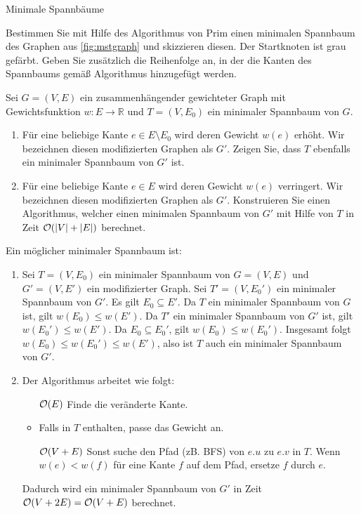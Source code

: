\documentclass{article}
\begin{document}
\begin{eexercises}{Minimale Spannbäume}{}
  \item Bestimmen Sie mit Hilfe des Algorithmus von Prim einen minimalen Spannbaum des Graphen aus \ref{fig:mstgraph} und skizzieren diesen. Der Startknoten ist grau gefärbt. Geben Sie zusätzlich die Reihenfolge an, in der die Kanten des Spannbaums gemäß Algorithmus hinzugefügt werden.
  \item Sei $G = (V, E)$ ein zusammenhängender gewichteter Graph mit Gewichtsfunktion $w : E \rightarrow \mathbb{R}$ und $T = (V, E_0)$ ein minimaler Spannbaum von $G$.
  \begin{enumerate}
    \item Für eine beliebige Kante $e \in E \setminus E_0$ wird deren Gewicht $w(e)$ erhöht. Wir bezeichnen diesen modifizierten Graphen als $G'$. Zeigen Sie, dass $T$ ebenfalls ein minimaler Spannbaum von $G'$ ist.
    \item Für eine beliebige Kante $e \in E$ wird deren Gewicht $w(e)$ verringert. Wir bezeichnen diesen modifizierten Graphen als $G'$. Konstruieren Sie einen Algorithmus, welcher einen minimalen Spannbaum von $G'$ mit Hilfe von $T$ in Zeit $\mathcal{O}(|V| + |E|)$ berechnet.
  \end{enumerate}
\end{eexercises}

\begin{solutions}
  \item Ein möglicher minimaler Spannbaum ist: 
  \item \begin{enumerate}
    \item Sei $T = (V, E_0)$ ein minimaler Spannbaum von $G = (V, E)$ und $G' = (V, E')$ ein modifizierter Graph. Sei $T' = (V, E_0')$ ein minimaler Spannbaum von $G'$. Es gilt $E_0 \subseteq E'$. Da $T$ ein minimaler Spannbaum von $G$ ist, gilt $w(E_0) \leq w(E')$. Da $T'$ ein minimaler Spannbaum von $G'$ ist, gilt $w(E_0') \leq w(E')$. Da $E_0 \subseteq E_0'$, gilt $w(E_0) \leq w(E_0')$. Insgesamt folgt $w(E_0) \leq w(E_0') \leq w(E')$, also ist $T$ auch ein minimaler Spannbaum von $G'$.
    \item Der Algorithmus arbeitet wie folgt: \begin{itemize}
            \item[$\mathcal{O}(E)$] Finde die veränderte Kante.
            \item Falls in $T$ enthalten, passe das Gewicht an.
            \item[$\mathcal{O}(V+E)$] Sonst suche den Pfad (zB. BFS) von $e.u$ zu $e.v$ in $T$. Wenn $w(e) < w(f)$ für eine Kante $f$ auf dem Pfad, ersetze $f$ durch $e$.
          \end{itemize}
          Dadurch wird ein minimaler Spannbaum von $G'$ in Zeit $\mathcal{O}(V+2E)=\mathcal{O}(V+E)$ berechnet.
  \end{enumerate}
\end{solutions}
\end{document}
